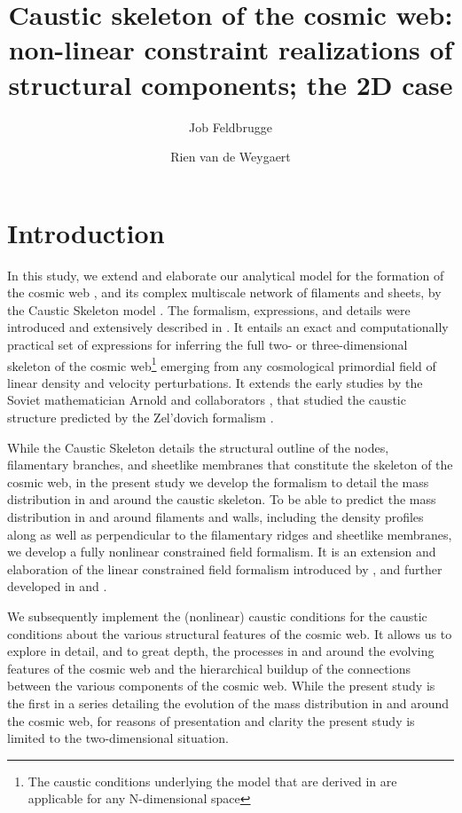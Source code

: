 \documentclass[a4paper, 11pt]{article}
\title{Caustic skeleton of the cosmic web: non-linear constraint realizations of structural components; the 2D case}
\author[a,b]{Job Feldbrugge}
\author[c]{Rien van de Weygaert}
\affiliation[a]{Higgs Centre for Theoretical Physics, University of Edinburgh, Edinburgh, Scotland, EH8 9YL}
\affiliation[b]{Physics department, Carnegie Mellon University, Pittsburgh, United States}
\affiliation[c]{Kapteyn Astronomical Institute, University of Groningen, Groningen, The Netherlands}
\begin{document}
\maketitle

\section{Introduction}
In this study, we extend and elaborate our analytical model for the formation of the cosmic web \cite{Zeldovich:1970,Bond:1996,Weygaert:2008}, and its complex multiscale network of filaments and sheets, by the Caustic Skeleton model \cite{Feldbrugge:2018}. The formalism, expressions, and details were introduced and extensively described in \cite{Feldbrugge:2018}. It entails an exact and computationally practical set of expressions for inferring the full two- or three-dimensional skeleton of the cosmic web\footnote{The caustic conditions underlying the model that are derived in \cite{Feldbrugge:2018} are applicable for any N-dimensional space} emerging from any cosmological primordial field of linear density and velocity perturbations. It extends the early studies by the Soviet mathematician Arnold and collaborators \cite{Arnold:1982a,Arnold:1982b}, that studied the caustic structure predicted by the Zel'dovich formalism \cite{Zeldovich:1970}.

While the Caustic Skeleton details the structural outline of the nodes, filamentary branches, and sheetlike membranes that constitute the skeleton of the cosmic web, in the present study we develop the formalism to detail the mass distribution in and around the caustic skeleton. To be able to predict the mass distribution in and around filaments and walls, including the density profiles along as well as perpendicular to the filamentary ridges and sheetlike membranes, we develop a fully nonlinear constrained field formalism. It is an extension and elaboration of the linear constrained field formalism introduced by \cite{Bertschinger:1987}, and further developed in \cite{Hoffman:1991} and \cite{Weygaert:1996}.

We subsequently implement the (nonlinear) caustic conditions for the caustic conditions about the various structural features of the cosmic web. It allows us to explore in detail, and to great depth, the processes in and around the evolving features of the cosmic web and the hierarchical buildup of the connections between the various components of the cosmic web. While the present study is the first in a series detailing the evolution of the mass distribution in and around the cosmic web, for reasons of presentation and clarity the present study is limited to the two-dimensional situation. 
\end{document}
